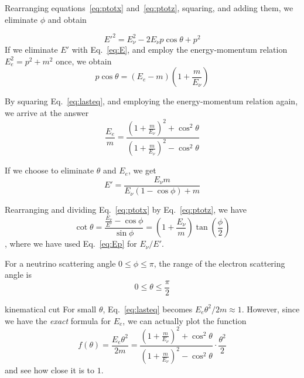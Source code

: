 \documentclass{beamer}
\begin{document}
\begin{frame}[allowframebreaks]{}
Rearranging equations~\eqref{eq:ptotx} and~\eqref{eq:ptotz}, squaring, and adding them, we eliminate $\phi$ and obtain

\begin{equation}
  E'^2 = E^2_\nu -2E_\nu p\cos\theta+p^2
\end{equation}
If we eliminate $E'$ with Eq.~\eqref{eq:E}, and employ the energy-momentum relation $E_e^2=p^2+m^2$ once, we obtain
\begin{equation} \label{eq:lasteq}
  p\cos\theta=(E_e-m)\left( 1+\frac{m}{E_\nu} \right)
\end{equation}

\framebreak

By squaring Eq.~\eqref{eq:lasteq}, and employing the energy-momentum relation again, we arrive at the answer
\begin{equation} \label{eq:Ee}
  \boxed{\frac{E_e}{m}=\frac{\left( 1+\frac{m}{E_\nu} \right)^2+\cos^2\theta}{\left( 1+\frac{m}{E_\nu} \right)^2-\cos^2\theta}}
\end{equation}

If we choose to eliminate $\theta$ and $E_e$, we get
\begin{equation} \label{eq:Ep}
  E'=\frac{E_\nu m}{E_\nu(1-\cos\phi)+m}
\end{equation}

\framebreak

Rearranging and dividing Eq.~\eqref{eq:ptotx} by Eq.~\eqref{eq:ptotz}, we have
\begin{equation}
  \cot\theta=\frac{\frac{E_\nu}{E'}-\cos\phi}{\sin\phi}=\left( 1+\frac{E_\nu}{m} \right)\tan\left( \frac{\phi}{2} \right)
\end{equation}
, where we have used Eq.~\eqref{eq:Ep} for $E_\nu/E'$.

For a neutrino scattering angle $0\leq\phi\leq\pi$, the range of the electron scattering angle is
\begin{equation}
  \boxed{0\leq\theta\leq\frac{\pi}{2}}
\end{equation}
\end{frame}

\begin{frame}{kinematical cut}
  For small $\theta$, Eq.~\eqref{eq:lasteq} becomes $E_e\theta^2/2m\approx 1$. However, since we have the \emph{exact} formula for $E_e$, we can actually plot the function
\begin{equation} \label{eq:exact_cut_function}
  f(\theta)=\frac{E_e\theta^2}{2m}=\frac{\left( 1+\frac{m}{E_\nu} \right)^2+\cos^2\theta}{\left( 1+\frac{m}{E_\nu} \right)^2-\cos^2\theta}\cdot\frac{\theta^2}{2}
\end{equation}
and see how close it is to $1$.
\end{frame}
\end{document}
